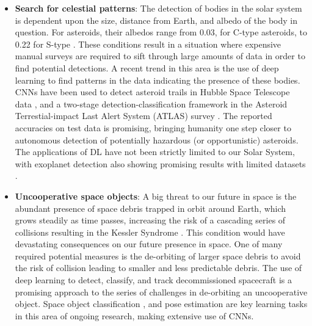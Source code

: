 \begin{itemize}
    \item \textbf{Search for celestial patterns}: The detection of bodies in
          the solar system is dependent upon the size, distance from Earth, and
          albedo of the body in question. For asteroids, their albedos range
          from 0.03, for C-type asteroids, to 0.22 for S-type
          \cite{planetary_data}. These conditions result in a situation where
          expensive manual surveys are required to sift through large amounts of
          data in order to find potential detections. A recent trend in this
          area is the use of deep learning to find patterns in the data
          indicating the presence of these bodies. \glspl{CNN} have been used to
          detect asteroid trails in Hubble Space Telescope data
          \cite{parfeni2020detection}, and a two-stage detection-classification
          framework in the Asteroid Terrestial-impact Last Alert System (ATLAS)
          survey \cite{Chyba_Rabeendran_2021}. The reported accuracies on
          test data is promising, bringing humanity one step closer to
          autonomous detection of potentially hazardous (or opportunistic)
          asteroids. The applications of \gls{DL} have not been strictly limited
          to our Solar System, with exoplanet detection also showing promising
          results with limited datasets \cite{bird2020model}.

    \item \textbf{Uncooperative space objects}: A big threat to our future in
          space is the abundant presence of space debris trapped in orbit around
          Earth, which grows steadily as time passes, increasing the risk of a
          cascading series of collisions resulting in the Kessler Syndrome
          \cite{https://doi.org/10.1029/JA083iA06p02637}. This condition would
          have devastating consequences on our future presence in space. One of
          many required potential measures is the de-orbiting of larger space
          debris to avoid the risk of collision leading to smaller and less
          predictable debris. The use of deep learning to detect, classify, and
          track decommissioned spacecraft is a promising approach to the series
          of challenges in de-orbiting an uncooperative object. Space object
          classification \cite{doi:10.1177/0954410021996129, 8009786}, and
          pose estimation \cite{Afshar2020, Ren2020} are key learning tasks in this
          area of ongoing research, making extensive use of \glspl{CNN}.


\end{itemize}
